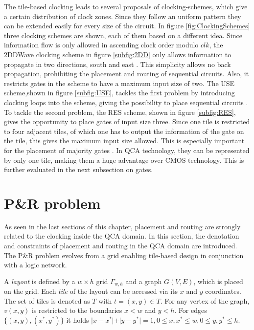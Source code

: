 The tile-based clocking leads to several proposals of clocking-schemes, which give a certain distribution of clock zones. Since they follow an uniform pattern they can be extended easily for every size of the circuit. In figure \ref{fig:ClockingSchemes} three clocking schemes are shown, each of them based on a different idea. Since information flow is only allowed in ascending clock order modulo $clk$, the 2DDWave clocking scheme in figure \ref{subfig:2DD} only allows information to propagate in two directions, south and east \cite{2DD}. This simplicity allows no back propagation, prohibiting the placement and routing of sequential circuits. Also, it restricts gates in the scheme to have a maximum input size of two. The USE scheme,shown in figure \ref{subfig:USE}, tackles the first problem by introducing clocking loops into the scheme, giving the possibility to place sequential circuits \cite{USE}. To tackle the second problem, the RES scheme, shown in figure \ref{subfig:RES}, gives the opportunity to place gates of input size three. Since one tile is restricted to four adjacent tiles, of which one has to output the information of the gate on the tile, this gives the maximum input size allowed. This is especially important for the placement of majority gates \cite{RES}. In QCA technology, they can be represented by only one tile, making them a huge advantage over CMOS technology. This is further evaluated in the next subsection on gates.

\section{P\&R problem} \label{sec:PR}

As seen in the last sections of this chapter, placement and routing are strongly related to the clocking inside the QCA domain. In this section, the denotation and constraints of placement and routing in the QCA domain are introduced. The P\&R problem evolves from a grid enabling tile-based design in conjunction with a logic network.

\begin{definition}
	A \textit{layout} is defined by a $w \times h$ grid $\Gamma_{w, h}$ and a graph $G(V, E)$, which is placed on the grid. Each \textit{tile} of the layout can be accessed via its $x$ and $y$ coordinates. The set of tiles is denoted as $T$ with $t = (x, y) \in T$. For any vertex of the graph, $v(x, y)$ is restricted to the boundaries $x < w$ and $y < h$. For edges $\{(x, y), (x^*, y^*)\}$ it holds $\vert x-x^*\vert+\vert y-y^*\vert = 1, 0 \leq x, x^* \leq w, 0 \leq y, y^* \leq h$.
\end{definition}

